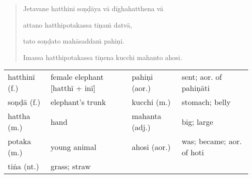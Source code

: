 \documentclass[11pt,oneside]{memoir}
\begin{document}
\casesLegendHeaderBGHere

\begin{quote}
Jetavane hatthinī soṇḍāya vā dīghahatthena vā

attano hatthipotakassa tiṇaṁ datvā,

tato soṇḍato mahāsaddaṁ pahiṇi.

Imassa hatthipotakassa tiṇena kucchi mahanto ahosi.
\end{quote}

\bigskip

\begin{center}
\begin{tabular}{llll}
hatthinī (f.) & female elephant [hatthī + inī] & pahiṇi (aor.) & sent; aor. of pahiṇāti\\[0pt]
soṇḍā (f.) & elephant's trunk & kucchi (m.) & stomach; belly\\[0pt]
hattha (m.) & hand & mahanta (adj.) & big; large\\[0pt]
potaka (m.) & young animal & ahosi (aor.) & was; became; aor. of hoti\\[0pt]
tiṅa (nt.) & grass; straw &  & \\[0pt]
\end{tabular}
\end{center}

\enlargethispage{\baselineskip}
\renewcommand{\arraystretch}{1.6}
\end{document}
